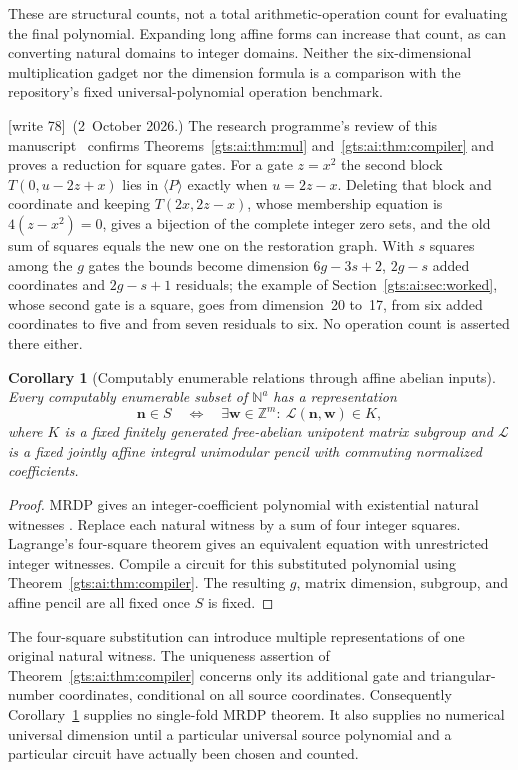 \documentclass[11pt,letterpaper]{article}
\newtheorem{corollary}[theorem]{Corollary}
\theoremstyle{definition}
\theoremstyle{remark}
\newcommand{\Z}{\mathbb Z}
\newcommand{\N}{\mathbb N}
\newcommand{\wtagb}{\textup{[write 78]}}
\begin{document}
These are structural counts, not a total arithmetic-operation count for evaluating the final polynomial. Expanding long affine forms can increase that count, as can converting natural domains to integer domains. Neither the six-dimensional multiplication gadget nor the dimension formula is a comparison with the repository's fixed universal-polynomial operation benchmark.

\wtagb\ (2~October 2026.) The research programme's review of this manuscript~\cite{repo-revaffine} confirms Theorems~\ref{gts:ai:thm:mul} and~\ref{gts:ai:thm:compiler} and proves a reduction for square gates. For a gate $z=x^2$ the second block $T(0,u-2z+x)$ lies in $\langle P\rangle$ exactly when $u=2z-x$. Deleting that block and coordinate and keeping $T(2x,2z-x)$, whose membership equation is $4(z-x^2)=0$, gives a bijection of the complete integer zero sets, and the old sum of squares equals the new one on the restoration graph. With $s$ squares among the $g$ gates the bounds become dimension $6g-3s+2$, $2g-s$ added coordinates and $2g-s+1$ residuals; the example of Section~\ref{gts:ai:sec:worked}, whose second gate is a square, goes from dimension~20 to~17, from six added coordinates to five and from seven residuals to six. No operation count is asserted there either.

\begin{corollary}[Computably enumerable relations through affine abelian inputs]\label{gts:ai:cor:abuniversality}
Every computably enumerable subset of $\N^a$ has a representation
\[
 \mathbf n\in S\quad\Longleftrightarrow\quad
 \exists\mathbf w\in\Z^m:\ \mathcal L(\mathbf n,\mathbf w)\in K,
\]
where $K$ is a fixed finitely generated free-abelian unipotent matrix subgroup and $\mathcal L$ is a fixed jointly affine integral unimodular pencil with commuting normalized coefficients.
\end{corollary}
\begin{proof}
MRDP gives an integer-coefficient polynomial with existential natural witnesses \cite{ai-matiyasevich,ai-repomrdp}. Replace each natural witness by a sum of four integer squares. Lagrange's four-square theorem gives an equivalent equation with unrestricted integer witnesses. Compile a circuit for this substituted polynomial using Theorem~\ref{gts:ai:thm:compiler}. The resulting $g$, matrix dimension, subgroup, and affine pencil are all fixed once $S$ is fixed.
\end{proof}
The four-square substitution can introduce multiple representations of one original natural witness. The uniqueness assertion of Theorem~\ref{gts:ai:thm:compiler} concerns only its additional gate and triangular-number coordinates, conditional on all source coordinates. Consequently Corollary~\ref{gts:ai:cor:abuniversality} supplies no single-fold MRDP theorem. It also supplies no numerical universal dimension until a particular universal source polynomial and a particular circuit have actually been chosen and counted.
\end{document}
